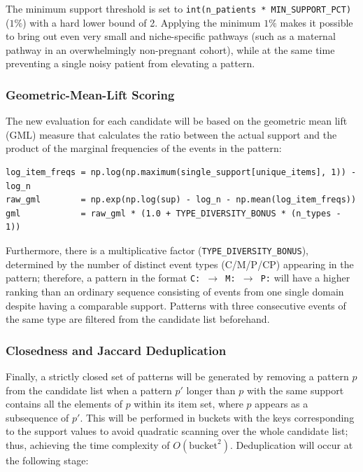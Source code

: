 The minimum support threshold is set to \texttt{int(n\_patients * MIN\_SUPPORT\_PCT)} (\(1\%\)) with a hard lower bound of 2. Applying the minimum \(1\%\) makes it possible to bring out even very small and niche-specific pathways (such as a maternal pathway in an overwhelmingly non-pregnant cohort), while at the same time preventing a single noisy patient from elevating a pattern.

\subsubsection*{Geometric-Mean-Lift Scoring}

The new evaluation for each candidate will be based on the geometric mean lift (GML) measure that calculates the ratio between the actual support and the product of the marginal frequencies of the events in the pattern:

\begin{lstlisting}[style=pythonstyle]
log_item_freqs = np.log(np.maximum(single_support[unique_items], 1)) - log_n
raw_gml        = np.exp(np.log(sup) - log_n - np.mean(log_item_freqs))
gml            = raw_gml * (1.0 + TYPE_DIVERSITY_BONUS * (n_types - 1))

\end{lstlisting}

Furthermore, there is a multiplicative factor (\texttt{TYPE\_DIVERSITY\_BONUS}), determined by the number of distinct event types (C/M/P/CP) appearing in the pattern; therefore, a pattern in the format \texttt{C: \(\rightarrow\) M: \(\rightarrow\) P:} will have a higher ranking than an ordinary sequence consisting of events from one single domain despite having a comparable support. Patterns with three consecutive events of the same type are filtered from the candidate list beforehand.

\subsubsection*{Closedness and Jaccard Deduplication}

Finally, a strictly closed set of patterns will be generated by removing a pattern \(p\) from the candidate list when a pattern \(p'\) longer than \(p\) with the same support contains all the elements of \(p\) within its item set, where \(p\) appears as a subsequence of \(p'\). This will be performed in buckets with the keys corresponding to the support values to avoid quadratic scanning over the whole candidate list; thus, achieving the time complexity of \(O(\text{bucket}^2)\). Deduplication will occur at the following stage:

